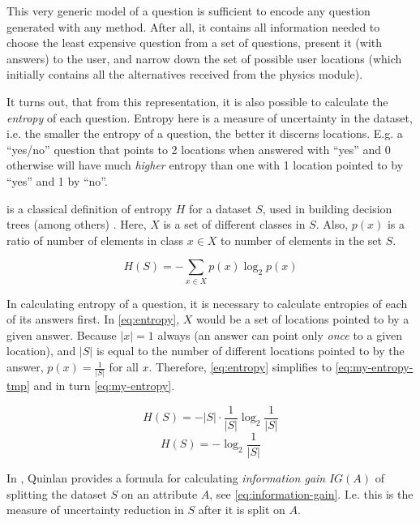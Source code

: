This very generic model of a question is sufficient to encode any question generated with any method. After all, it contains all information needed to choose the least expensive question from a set of questions, present it (with answers) to the user, and narrow down the set of possible user locations (which initially contains all the alternatives received from the physics module).

It turns out, that from this representation, it is also possible to calculate the \emph{entropy} of each question. Entropy here is a measure of uncertainty in the dataset, i.e. the smaller the entropy of a question, the better it discerns locations. E.g. a ``yes/no'' question that points to 2 locations when answered with ``yes'' and 0 otherwise will have much \emph{higher} entropy than one with 1 location pointed to by ``yes'' and 1 by ``no''.

 is a classical definition of entropy $H$ for a dataset $S$, used in building decision trees (among others) \cite{quinlan1986induction}. Here, $X$ is a set of different classes in $S$. Also, $p(x)$ is a ratio of number of elements in class $x \in X$ to number of elements in the set $S$.

\begin{equation}
  \label{eq:entropy}
  H(S)=-\sum_{x \in X} p(x) \log_2 p(x)
\end{equation}

In calculating entropy of a question, it is necessary to calculate entropies of each of its answers first. In \cref{eq:entropy}, $X$ would be a set of locations pointed to by a given answer. Because $\vert x \vert = 1$ always (an answer can point only \emph{once} to a given location), and $\vert S \vert$ is equal to the number of different locations pointed to by the answer, $p(x)=\frac{1}{\vert S \vert}$ for all $x$. Therefore, \cref{eq:entropy} simplifies to \cref{eq:my-entropy-tmp} and in turn \cref{eq:my-entropy}.

\begin{equation}
  \label{eq:my-entropy-tmp}
  H(S) = -\vert S \vert \cdot \frac{1}{\vert S \vert} \log_2 \frac{1}{\vert S \vert}
\end{equation}
\begin{equation}
  \label{eq:my-entropy}
  H(S) = -\log_2 \frac{1}{\vert S \vert}
\end{equation}

In \cite{quinlan1986induction}, Quinlan provides a formula for calculating \emph{information gain} $IG(A)$ of splitting the dataset $S$ on an attribute $A$, see \cref{eq:information-gain}. I.e. this is the measure of uncertainty reduction in $S$ after it is split on $A$.

